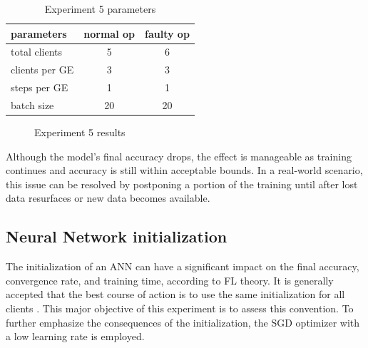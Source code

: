 \begin{table}[H]
    \center
    \begin{tabular}
        { | l | c | c | }
        \hline
        parameters & normal op & faulty op\\\hline
        total clients   & 5 & 6\\\hline
        clients per GE  & 3 & 3\\\hline
        steps per GE    & 1 & 1\\\hline
        batch size      & 20 & 20\\\hline
    \end{tabular}
    \caption[Experiment 5 parameters]{Experiment 5 parameters}
    \label{table:Experiment 5 parameters}
\end{table}
    
\begin{figure}[H]
    \center
    
    \caption[Experiment 5 results]{Experiment 5 results}
    \label{fig:Experiment 5 results}
\end{figure}

Although the model's final accuracy drops, the effect is manageable as training continues and accuracy is still within acceptable bounds. In a real-world scenario, this issue can be resolved by postponing a portion of the training until after lost data resurfaces or new data becomes available.

\subsection{Neural Network initialization}

The initialization of an ANN can have a significant impact on the final accuracy, convergence rate, and training time, according to FL theory. It is generally accepted that the best course of action is to use the same initialization for all clients \cite{FL-original-paper}.  This major objective of this experiment is to assess this convention. To further emphasize the consequences of the initialization, the SGD optimizer with a low learning rate is employed.

\begin{table}[H]
    \center
    \caption[Experiment 6 parameters]{Experiment 6 parameters}
    \label{table:Experiment 6 parameters}
\end{table}

